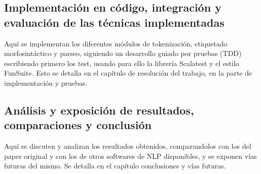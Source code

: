 \subsection*{Implementación en código, integración y evaluación de las técnicas implementadas}
Aquí se implementan los diferentes módulos de tokenización, etiquetado morfosintáctico y parseo, siguiendo un desarrollo guiado por pruebas (TDD) escribiendo primero los test, usando para ello la librería Scalatest y el estilo FunSuite. Esto se detalla en el capítulo de resolución del trabajo, en la parte de implementación y pruebas. 

\subsection*{Análisis y exposición de resultados, comparaciones y conclusión}   
Aquí se discuten y analizan los resultados obtenidos, comparandolos con los del paper original y con los de otros softwares de NLP disponibles, y se exponen vías futuras del mismo. Se detalla en el capítulo conclusiones y vías futuras.


